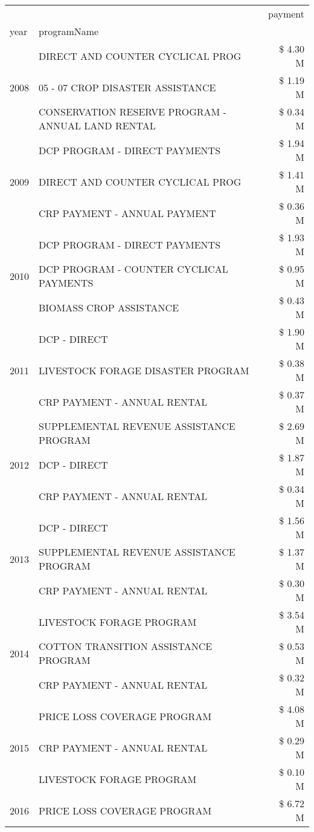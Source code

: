 \begin{tabular}{llr}
\toprule
 &  & payment \\
year & programName &  \\
\midrule
\multirow[t]{3}{*}{2008} & DIRECT AND COUNTER CYCLICAL PROG & \$ 4.30 M \\
 & 05 - 07 CROP DISASTER ASSISTANCE & \$ 1.19 M \\
 & CONSERVATION RESERVE PROGRAM - ANNUAL LAND RENTAL & \$ 0.34 M \\
\cline{1-3}
\multirow[t]{3}{*}{2009} & DCP PROGRAM - DIRECT PAYMENTS & \$ 1.94 M \\
 & DIRECT AND COUNTER CYCLICAL PROG & \$ 1.41 M \\
 & CRP PAYMENT - ANNUAL PAYMENT & \$ 0.36 M \\
\cline{1-3}
\multirow[t]{3}{*}{2010} & DCP PROGRAM - DIRECT PAYMENTS & \$ 1.93 M \\
 & DCP PROGRAM - COUNTER CYCLICAL PAYMENTS & \$ 0.95 M \\
 & BIOMASS CROP ASSISTANCE & \$ 0.43 M \\
\cline{1-3}
\multirow[t]{3}{*}{2011} & DCP - DIRECT & \$ 1.90 M \\
 & LIVESTOCK FORAGE DISASTER PROGRAM & \$ 0.38 M \\
 & CRP PAYMENT - ANNUAL RENTAL & \$ 0.37 M \\
\cline{1-3}
\multirow[t]{3}{*}{2012} & SUPPLEMENTAL REVENUE ASSISTANCE PROGRAM & \$ 2.69 M \\
 & DCP - DIRECT & \$ 1.87 M \\
 & CRP PAYMENT - ANNUAL RENTAL & \$ 0.34 M \\
\cline{1-3}
\multirow[t]{3}{*}{2013} & DCP - DIRECT & \$ 1.56 M \\
 & SUPPLEMENTAL REVENUE ASSISTANCE PROGRAM & \$ 1.37 M \\
 & CRP PAYMENT - ANNUAL RENTAL & \$ 0.30 M \\
\cline{1-3}
\multirow[t]{3}{*}{2014} & LIVESTOCK FORAGE PROGRAM & \$ 3.54 M \\
 & COTTON TRANSITION ASSISTANCE PROGRAM & \$ 0.53 M \\
 & CRP PAYMENT - ANNUAL RENTAL & \$ 0.32 M \\
\cline{1-3}
\multirow[t]{3}{*}{2015} & PRICE LOSS COVERAGE PROGRAM & \$ 4.08 M \\
 & CRP PAYMENT - ANNUAL RENTAL & \$ 0.29 M \\
 & LIVESTOCK FORAGE PROGRAM & \$ 0.10 M \\
\cline{1-3}
\multirow[t]{3}{*}{2016} & PRICE LOSS COVERAGE PROGRAM                   & \$ 6.72 M \\

\end{tabular}
